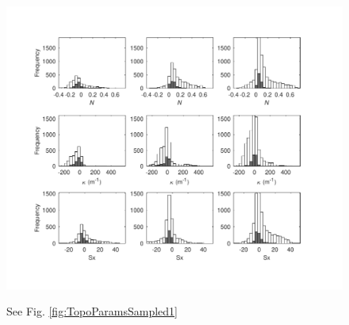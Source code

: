 \documentclass[twocolumn, letterpaper]{igs}
\begin{document}
\begin{figure}
	\centering
	\includegraphics[width =\textwidth]{TopoParamsSampled2.pdf}\\
	\caption{See Fig. \ref{fig:TopoParamsSampled1}}
	\label{fig:TopoParamsSampled2}
\end{figure}

\end{document}
